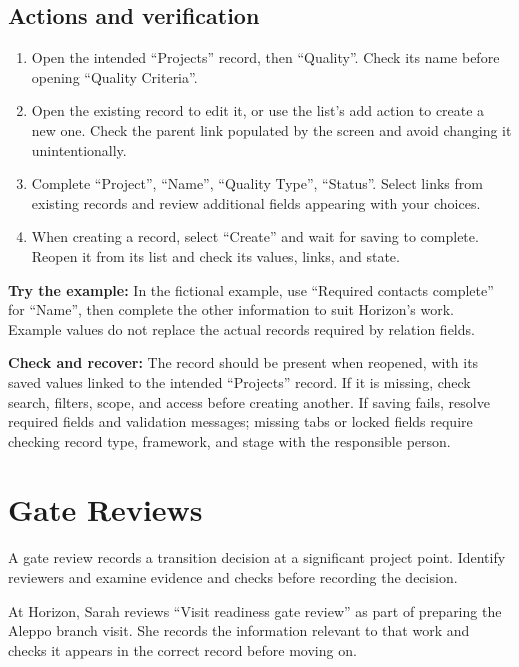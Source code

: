 \subsection{Actions and verification}
\begin{enumerate}
\item Open the intended “Projects” record, then “Quality”. Check its name before opening “Quality Criteria”.
\item Open the existing record to edit it, or use the list's add action to create a new one. Check the parent link populated by the screen and avoid changing it unintentionally.
\item Complete “Project”, “Name”, “Quality Type”, “Status”. Select links from existing records and review additional fields appearing with your choices.
\item When creating a record, select “Create” and wait for saving to complete. Reopen it from its list and check its values, links, and state.
\end{enumerate}

\textbf{Try the example:} In the fictional example, use “Required contacts complete” for “Name”, then complete the other information to suit Horizon's work. Example values do not replace the actual records required by relation fields.

\textbf{Check and recover:} The record should be present when reopened, with its saved values linked to the intended “Projects” record. If it is missing, check search, filters, scope, and access before creating another. If saving fails, resolve required fields and validation messages; missing tabs or locked fields require checking record type, framework, and stage with the responsible person.

\clearpage
\section{Gate Reviews}
\label{sec:projects-feature-gate-reviews}

A gate review records a transition decision at a significant project point. Identify reviewers and examine evidence and checks before recording the decision.

\begin{rcnote}
At Horizon, Sarah reviews “Visit readiness gate review” as part of preparing the Aleppo branch visit. She records the information relevant to that work and checks it appears in the correct record before moving on.
\end{rcnote}

